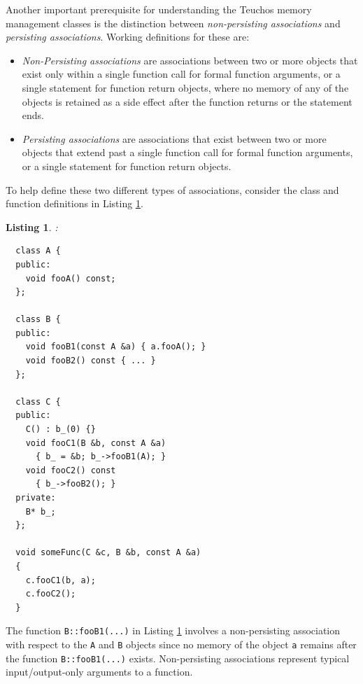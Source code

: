 \documentclass[pdf,ps2pdf,11pt]{SANDreport}
\newtheorem{listing}{Listing}
\begin{document}
Another important prerequisite for understanding the Teuchos memory
management classes is the distinction between {}\textit{non-persisting
associations} and {}\textit{persisting associations}.  Working
definitions for these are:

\begin{itemize}

{}\item\textit{Non-Persisting associations} are associations between
two or more objects that exist only within a single function call for
formal function arguments, or a single statement for function return
objects, where no memory of any of the objects is retained as a side
effect after the function returns or the statement ends.

{}\item\textit{Persisting associations} are associations that exist
between two or more objects that extend past a single function call
for formal function arguments, or a single statement for function
return objects.

\end{itemize}

To help define these two different types of associations, consider the
class and function definitions in Listing
{}\ref{listing:NonPersistingPersistingAssociationsRawPointers}.

\begin{listing}:\\
\label{listing:NonPersistingPersistingAssociationsRawPointers}
{\small\begin{verbatim}
  class A {
  public:
    void fooA() const;
  };

  class B {
  public:
    void fooB1(const A &a) { a.fooA(); }
    void fooB2() const { ... }
  };

  class C {
  public:
    C() : b_(0) {}
    void fooC1(B &b, const A &a)
      { b_ = &b; b_->fooB1(A); }
    void fooC2() const
      { b_->fooB2(); }
  private:
    B* b_;    
  };

  void someFunc(C &c, B &b, const A &a)
  {
    c.fooC1(b, a);
    c.fooC2();
  }
\end{verbatim}}
\end{listing}

The function {}\texttt{B::fooB1(...)} in Listing
{}\ref{listing:NonPersistingPersistingAssociationsRawPointers}
involves a non-persisting association with respect to the {}\texttt{A}
and {}\texttt{B} objects since no memory of the object {}\texttt{a}
remains after the function {}\texttt{B::fooB1(...)} exists.
Non-persisting associations represent typical input/output-only
arguments to a function.
\end{document}
